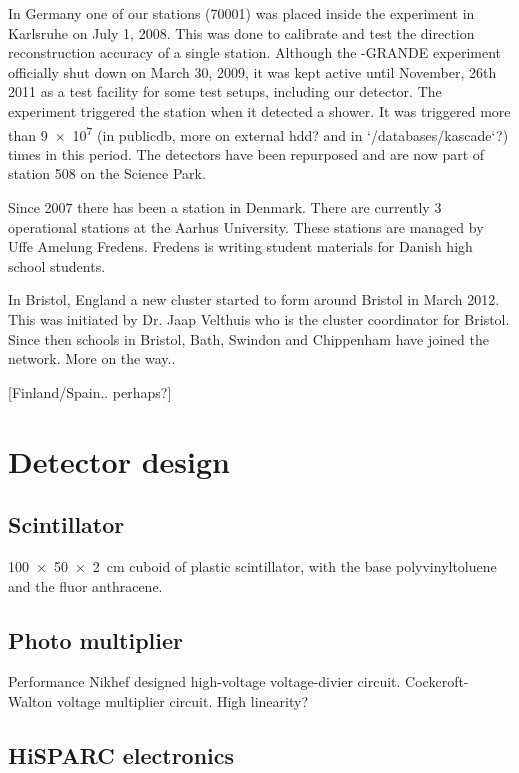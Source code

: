 In Germany one of our stations (70001) was placed inside the \kascade
experiment in Karlsruhe on July 1, 2008. This was done to calibrate and
test the direction reconstruction accuracy of a single \hisparc station.
Although the \kascade-GRANDE experiment officially shut down on March
30, 2009, it was kept active until November, 26th 2011 as a test
facility for some test setups, including our detector. The \kascade
experiment triggered the \hisparc station when it detected a shower. It
was triggered more than \num{9e7} (in publicdb, more on external hdd?
and in `/databases/kascade`?) times in this period. The detectors have
been repurposed and are now part of station 508 on the Science Park.

Since 2007 there has been a \hisparc station in
Denmark. There are currently 3 operational stations at the Aarhus
University. These stations are managed by Uffe Amelung Fredens.
Fredens is writing student materials for Danish high school students.

In Bristol, England a new cluster started to form around Bristol in
March 2012. This was initiated by Dr. Jaap Velthuis who is the cluster
coordinator for Bristol. Since then schools in Bristol, Bath, Swindon
and Chippenham have joined the network. More on the way..

[Finland/Spain.. perhaps?]


\section{Detector design}
\label{sec:detector_design}

\subsection{Scintillator}

\SI{100 x 50 x 2}{\centi\meter} cuboid of plastic scintillator, with the
base polyvinyltoluene and the fluor anthracene. 


\subsection{Photo multiplier}

Performance
Nikhef designed high-voltage voltage-divier circuit.
Cockcroft-Walton voltage multiplier circuit.
High linearity?


\subsection{HiSPARC electronics}

